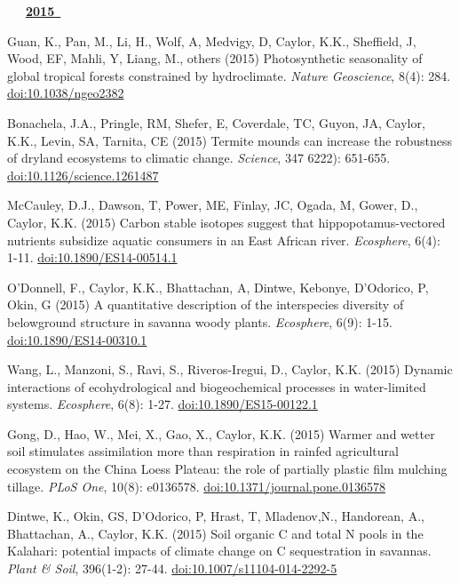 \begin{etaremune}
\mbox{\ \ \ \underline{\textbf{2015 }}}

\item Guan, K., Pan, M., Li, H., Wolf, A, Medvigy, D, Caylor, K.K., Sheffield, J, Wood, EF, Mahli, Y, Liang, M., others (2015) Photosynthetic seasonality of global tropical forests constrained by hydroclimate. \emph{Nature Geoscience}, 8(4): 284. \href{https://doi.org/10.1038/ngeo2382}{doi:10.1038/ngeo2382}
\item Bonachela, J.A., Pringle, RM, Shefer, E, Coverdale, TC, Guyon, JA, Caylor, K.K., Levin, SA, Tarnita, CE (2015) Termite mounds can increase the robustness of dryland ecosystems to climatic change. \emph{Science}, 347 6222): 651-655. \href{https://doi.org/10.1126/science.1261487}{doi:10.1126/science.1261487}
\item McCauley, D.J., Dawson, T, Power, ME, Finlay, JC, Ogada, M, Gower, D., Caylor, K.K. (2015) Carbon stable isotopes suggest that hippopotamus-vectored nutrients subsidize aquatic consumers in an East African river. \emph{Ecosphere}, 6(4): 1-11. \href{https://doi.org/10.1890/ES14-00514.1}{doi:10.1890/ES14-00514.1}
\item O'Donnell, F., Caylor, K.K., Bhattachan, A, Dintwe, Kebonye, D'Odorico, P, Okin, G (2015) A quantitative description of the interspecies diversity of belowground structure in savanna woody plants. \emph{Ecosphere}, 6(9): 1-15. \href{https://doi.org/10.1890/ES14-00310.1}{doi:10.1890/ES14-00310.1}
\item Wang, L., Manzoni, S., Ravi, S., Riveros-Iregui, D., Caylor, K.K. (2015) Dynamic interactions of ecohydrological and biogeochemical processes in water-limited systems. \emph{Ecosphere}, 6(8): 1-27. \href{https://doi.org/10.1890/ES15-00122.1}{doi:10.1890/ES15-00122.1}
\item Gong, D., Hao, W., Mei, X., Gao, X., Caylor, K.K. (2015) Warmer and wetter soil stimulates assimilation more than respiration in rainfed agricultural ecosystem on the China Loess Plateau: the role of partially plastic film mulching tillage. \emph{PLoS One}, 10(8): e0136578. \href{https://doi.org/10.1371/journal.pone.0136578}{doi:10.1371/journal.pone.0136578}
\item Dintwe, K., Okin, GS, D'Odorico, P, Hrast, T, Mladenov,N., Handorean, A., Bhattachan, A., Caylor, K.K. (2015) Soil organic C and total N pools in the Kalahari: potential impacts of climate change on C sequestration in savannas. \emph{Plant \& Soil}, 396(1-2): 27-44. \href{https://doi.org/10.1007/s11104-014-2292-5}{doi:10.1007/s11104-014-2292-5}


\end{etaremune}
